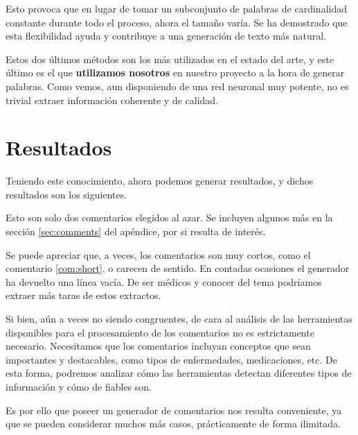 Esto provoca que en lugar de tomar un subconjunto de palabras de cardinalidad constante durante todo el proceso, ahora el tamaño varía. Se ha demostrado que esta flexibilidad ayuda y contribuye a una generación de texto más natural.

Estos dos últimos métodos son los más utilizados en el estado del arte, y este último es el que \textbf{utilizamos nosotros} en nuestro proyecto a la hora de generar palabras. Como vemos, aun disponiendo de una red neuronal muy potente, no es trivial extraer información coherente y de calidad.



\section{Resultados}
Teniendo este conocimiento, ahora podemos generar resultados, y dichos resultados son los siguientes.

\begin{thm}
\end{thm}
\begin{thm}
\end{thm}

Esto son solo dos comentarios elegidos al azar. Se incluyen algunos más en la sección \ref{sec:comments} del apéndice, por si resulta de interés.

Se puede apreciar que, a veces, los comentarios son muy cortos, como el comentario \ref{com:short}, o carecen de sentido. En contadas ocasiones el generador ha devuelto una línea vacía. De ser médicos y conocer del tema podríamos extraer más taras de estos extractos. 

Si bien, aún a veces no siendo congruentes, de cara al análisis de las herramientas disponibles para el procesamiento de los comentarios no es estrictamente necesario. Necesitamos que los comentarios incluyan conceptos que sean importantes y destacables, como tipos de enfermedades, medicaciones, etc. De esta forma, podremos analizar cómo las herramientas detectan diferentes tipos de información y cómo de fiables son. 

Es por ello que poseer un generador de comentarios nos resulta conveniente, ya que se pueden considerar muchos más casos, prácticamente de forma ilimitada.